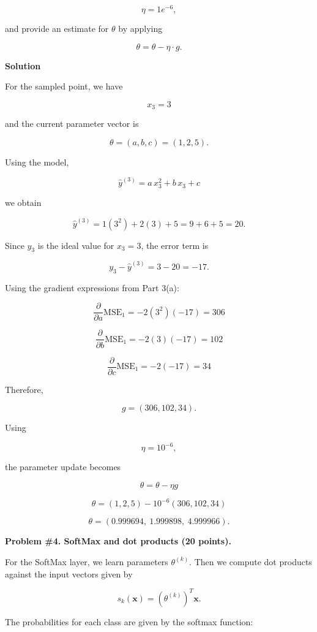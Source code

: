 \documentclass[12pt]{article}
\begin{document}
	\[
	\eta=1e^{-6},
	\]
	
	and provide an estimate for \(\theta\) by applying
	
	\[
	\theta=\theta-\eta\cdot g.
	\]
	
	\noindent\textbf{Solution}
	
	For the sampled point, we have
	
	\[
	x_3=3
	\]
	
	and the current parameter vector is
	
	\[
	\theta=(a,b,c)=(1,2,5).
	\]
	
	Using the model,
	
	\[
	\hat{y}^{(3)}
	=
	a\,x_3^2+b\,x_3+c
	\]
	
	we obtain
	
	\[
	\hat{y}^{(3)}
	=
	1(3^2)+2(3)+5
	=
	9+6+5
	=
	20.
	\]
	
	Since \(y_3\) is the ideal value for \(x_3=3\), the error term is
	
	\[
	y_3-\hat{y}^{(3)}
	=
	3-20
	=
	-17.
	\]
	
	Using the gradient expressions from Part 3(a):
	
	\[
	\frac{\partial}{\partial a}\mathrm{MSE}_1
	=
	-2(3^2)(-17)
	=
	306
	\]
	
	\[
	\frac{\partial}{\partial b}\mathrm{MSE}_1
	=
	-2(3)(-17)
	=
	102
	\]
	
	\[
	\frac{\partial}{\partial c}\mathrm{MSE}_1
	=
	-2(-17)
	=
	34
	\]
	
	Therefore,
	
	\[
	g=(306,102,34).
	\]
	
	Using
	
	\[
	\eta=10^{-6},
	\]
	
	the parameter update becomes
	
	\[
	\theta
	=
	\theta-\eta g
	\]
	
	\[
	\theta
	=
	(1,2,5)-10^{-6}(306,102,34)
	\]
	
	\[
	\theta
	=
	(0.999694,\ 1.999898,\ 4.999966).
	\]
		
	\newpage
	
	\noindent\textbf{Problem \#4. SoftMax and dot products (20 points).}
	
	For the SoftMax layer, we learn parameters \(\theta^{(k)}\). Then we compute dot products against the input vectors given by
	
	\[
	s_k(\mathbf{x})
	=
	(\theta^{(k)})^T\mathbf{x}.
	\]
	
	The probabilities for each class are given by the softmax function:
	
\end{document}
